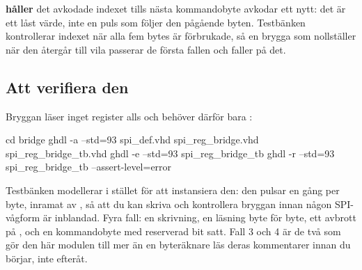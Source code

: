 \begin{warning}
 \textbf{håller} det avkodade indexet tills nästa kommandobyte avkodar ett nytt: det
är ett låst värde, inte en puls som följer den pågående byten. Testbänken kontrollerar indexet när
alla fem bytes är förbrukade, så en brygga som nollställer  när den återgår till vila
passerar de första fallen och faller på det.
\end{warning}

\subsection*{Att verifiera den}
Bryggan läser inget register alls och behöver därför bara :

\begin{shell}
cd bridge
ghdl -a --std=93 spi_def.vhd spi_reg_bridge.vhd spi_reg_bridge_tb.vhd
ghdl -e --std=93 spi_reg_bridge_tb
ghdl -r --std=93 spi_reg_bridge_tb --assert-level=error
\end{shell}

Testbänken modellerar  i stället för att instansiera den: den pulsar 
en gång per byte, inramat av , så att du kan skriva och kontrollera bryggan innan
någon SPI-vågform är inblandad. Fyra fall: en skrivning, en läsning byte för byte, ett avbrott på
, och en kommandobyte med reserverad bit satt. Fall 3 och 4 är de två som gör den här
modulen till mer än en byteräknare \textemdash{} läs deras kommentarer innan du börjar, inte efteråt.
